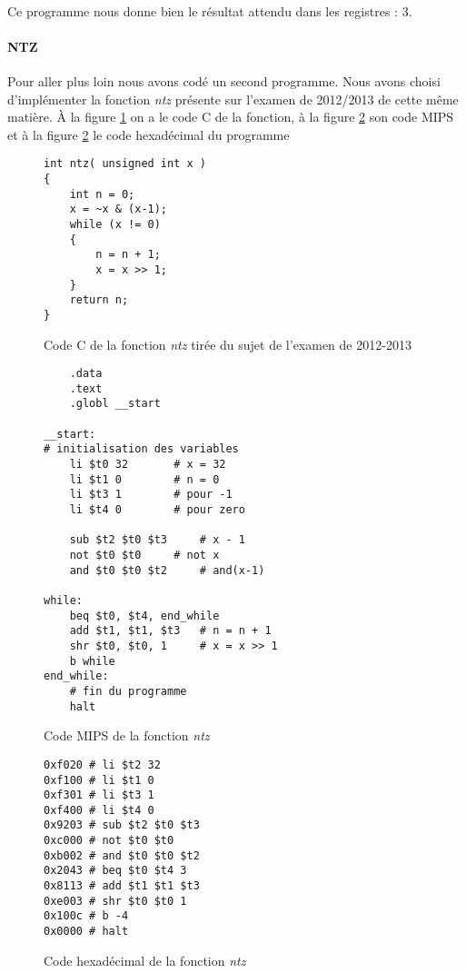 \paragraph{}{
	Ce programme nous donne bien le résultat attendu dans les registres : $3$.
}

\paragraph{NTZ}{
	Pour aller plus loin nous avons codé un second programme. Nous avons choisi
	d'implémenter la fonction \textit{ntz} présente sur l'examen de 2012/2013 de cette
	même matière. \newline
	À la figure \ref{ntz_c} on a le code C de la fonction, à la figure \ref{ntz_asm}
	son code MIPS et à la figure \ref{ntz_asm} le code hexadécimal du programme
}

\begin{figure}
	\lstset{
		frame=single,
		numbers=left,
		numbersep=5pt,
		language=C++
	}
	\begin{lstlisting}
int ntz( unsigned int x )
{
	int n = 0;
	x = ~x & (x-1);
	while (x != 0)
	{
		n = n + 1;
		x = x >> 1;
	}
	return n;
}
	\end{lstlisting}
	\caption{
		\label{ntz_c}
		Code C de la fonction \textit{ntz} tirée du sujet de l’examen de 2012-2013
	}
\end{figure}

\begin{figure}
	\begin{lstlisting}
	.data
	.text
	.globl __start
	
__start:
# initialisation des variables
	li $t0 32		# x = 32
	li $t1 0		# n = 0
	li $t3 1		# pour -1
	li $t4 0		# pour zero
		
	sub $t2 $t0 $t3		# x - 1
	not $t0 $t0		# not x
	and $t0 $t0 $t2		# and(x-1)
	
while:
	beq $t0, $t4, end_while	
	add $t1, $t1, $t3	# n = n + 1
	shr $t0, $t0, 1		# x = x >> 1
	b while			
end_while:
	# fin du programme
	halt
	\end{lstlisting}
	\caption{
		\label{ntz_asm}
		Code MIPS de la fonction \textit{ntz}
	}
\end{figure}

\begin{figure}
	\lstset{
		basicstyle=\ttfamily,
		frame=single,
		numbers=left,
		numbersep=5pt,
		language=[mips]Assembler
	}
	\begin{lstlisting}
0xf020 # li $t2 32
0xf100 # li $t1 0
0xf301 # li $t3 1
0xf400 # li $t4 0
0x9203 # sub $t2 $t0 $t3
0xc000 # not $t0 $t0
0xb002 # and $t0 $t0 $t2
0x2043 # beq $t0 $t4 3
0x8113 # add $t1 $t1 $t3
0xe003 # shr $t0 $t0 1
0x100c # b -4
0x0000 # halt
	\end{lstlisting}
	\caption{
		\label{ntz_hexa}
		Code hexadécimal de la fonction \textit{ntz}
	}
\end{figure}

